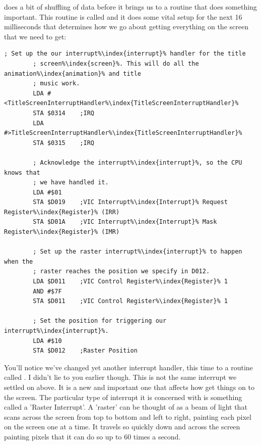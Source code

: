  does a bit of shuffling of data before it brings
us to a routine that does something important. This routine is called
and it does some vital setup for the next 16 milliseconds that determines how we go
about getting everything on the screen that we need to get:
\begin{lstlisting}[caption=In \icode{InitializeSpritesAndInterruptsForTitleScreen\index{InitializeSpritesAndInterruptsForTitleScreen}},escapechar=\%]
        ; Set up the our interrupt%\index{interrupt}% handler for the title
        ; screen%\index{screen}%. This will do all the animation%\index{animation}% and title
        ; music work.
        LDA #<TitleScreenInterruptHandler%\index{TitleScreenInterruptHandler}%
        STA $0314    ;IRQ
        LDA #>TitleScreenInterruptHandler%\index{TitleScreenInterruptHandler}%
        STA $0315    ;IRQ

        ; Acknowledge the interrupt%\index{interrupt}%, so the CPU knows that
        ; we have handled it.
        LDA #$01
        STA $D019    ;VIC Interrupt%\index{Interrupt}% Request Register%\index{Register}% (IRR)
        STA $D01A    ;VIC Interrupt%\index{Interrupt}% Mask Register%\index{Register}% (IMR)

        ; Set up the raster interrupt%\index{interrupt}% to happen when the
        ; raster reaches the position we specify in D012.
        LDA $D011    ;VIC Control Register%\index{Register}% 1
        AND #$7F
        STA $D011    ;VIC Control Register%\index{Register}% 1

        ; Set the position for triggering our interrupt%\index{interrupt}%.
        LDA #$10
        STA $D012    ;Raster Position
\end{lstlisting}

You'll notice we've changed yet another interrupt handler, this time to a routine called
. I didn't lie to you earlier though. This is not
the same interrupt we settled on above. It is a new and important one that affects how get things on to the screen.
The particular type of interrupt it is concerned with is something
called a 'Raster Interrupt'. A 'raster' can be thought of as a beam of light that scans
across the screen from top to bottom and left to right, painting each pixel on the screen
one at a time. It travels so quickly down and across the screen painting pixels that it
can do so up to 60 times a second.


